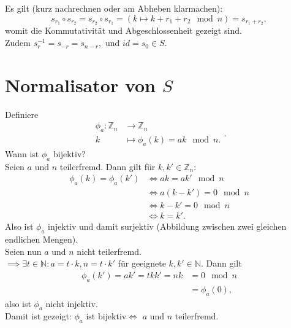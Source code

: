 \documentclass[a4paper]{article}
\newcommand{\N}{\mathbb{N}}
\newcommand{\Z}{\mathbb{Z}}
\begin{document}
    \begin{beweis}
        Es gilt (kurz nachrechnen oder am Abheben klarmachen):  
       \[
           s_{r_1} \circ s_{r_2} = s_{r_2} \circ s_{r_1} = (k \mapsto k + r_1 + r_2 \mod n) = s_{r_1 + r_2}
       ,\] 
       womit die Kommutativität und Abgeschlossenheit gezeigt sind. \\
       Zudem $s_{r}^{-1} = s_{-r} = s_{n-r},$ und $id = s_0 \in S$.
    \end{beweis}

    \section{Normalisator von $S$}
    \begin{bemerkung}
        Definiere
        \[
        \begin{align*}
            \phi_a: \Z_n &\longrightarrow \Z_n \\
            k &\longmapsto \phi_a(k) = ak \mod n
        .\end{align*}
        .\] 
        Wann ist $\phi_a$ bijektiv? \\
        Seien $a$ und $n$ teilerfremd. Dann gilt für $k, k' \in \Z_n:$ 
        \begin{align*}
            \phi_a(k) = \phi_a(k') &\iff ak = ak' \mod n \\
                                   &\iff a(k-k') = 0 \mod n \\
                                   &\iff k-k'  = 0 \mod n \\
                                   &\iff k = k'
        .\end{align*}
        Also ist $\phi_a$ injektiv und damit surjektiv (Abbildung zwischen zwei gleichen endlichen Mengen). \\
        Seien nun  $a$ und $n$ nicht teilerfremd. \\
         $\implies \exists t \in \N: a = t \cdot k, n = t \cdot k'$ für geeignete $k, k' \in \N$. Dann gilt
         \begin{align*}
             \phi_a(k') = a k' = t k k' = n k &= 0 \mod n \\
                                              &= \phi_a(0)
        , \end{align*} 
        also ist $\phi_a$ nicht injektiv. \\
        Damit ist gezeigt: $\phi_a \text{ ist bijektiv} \iff $ $a$ und  $n$ teilerfremd.
    \end{bemerkung}
\end{document}
